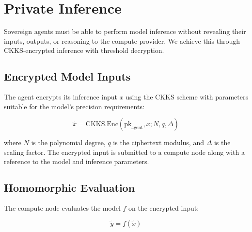 

\section{Private Inference}
\label{sec:private-inference}

Sovereign agents must be able to perform model inference without revealing their inputs, outputs, or reasoning to the compute provider. We achieve this through CKKS-encrypted inference with threshold decryption.

\subsection{Encrypted Model Inputs}

The agent encrypts its inference input $x$ using the CKKS scheme with parameters suitable for the model's precision requirements:

\begin{equation}\label{eq:enc-input}
    \tilde{x} = \text{CKKS.Enc}(\text{pk}_{\text{agent}}, x; N, q, \Delta)
\end{equation}

where $N$ is the polynomial degree, $q$ is the ciphertext modulus, and $\Delta$ is the scaling factor. The encrypted input is submitted to a compute node along with a reference to the model and inference parameters.

\subsection{Homomorphic Evaluation}

The compute node evaluates the model $f$ on the encrypted input:

\begin{equation}\label{eq:he-eval}
    \tilde{y} = f(\tilde{x})
\end{equation}

